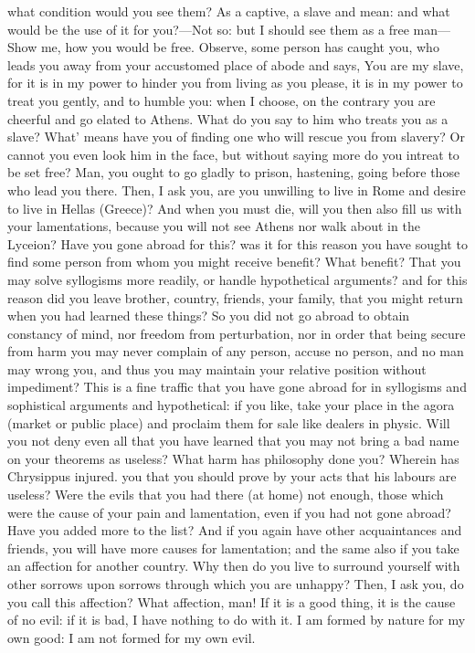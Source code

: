 \documentclass[12pt]{article}
\begin{document}
what condition would you see them? As a captive, a slave and mean: and what would be the use of it for you?—Not so: but I should see them as a free man—Show me, how you would be free. Observe, some person has caught you, who leads you away from your accustomed place of abode and says, You are my slave, for it is in my power to hinder you from living as you please, it is in my power to treat you gently, and to humble you: when I choose, on the contrary you are cheerful and go elated to Athens. What do you say to him who treats you as a slave? What' means have you of finding one who will rescue you from slavery? Or cannot you even look him in the face, but without saying more do you intreat to be set free? Man, you ought to go gladly to prison, hastening, going before those who lead you there. Then, I ask you, are you unwilling to live in Rome and desire to live in Hellas (Greece)? And when you must die, will you then also fill us with your lamentations, because you will not see Athens nor walk about in the Lyceion? Have you gone abroad for this? was it for this reason you have sought to find some person from whom you might receive benefit? What benefit? That you may solve syllogisms more readily, or handle hypothetical arguments? and for this reason did you leave brother, country, friends, your family, that you might return when you had learned these things? So you did not go abroad to obtain constancy of mind, nor freedom from perturbation, nor in order that being secure from harm you may never complain of any person, accuse no person, and no man may wrong you, and thus you may maintain your relative position without impediment? This is a fine traffic that you have gone abroad for in syllogisms and sophistical arguments and hypothetical: if you like, take your place in the agora (market or public place) and proclaim them for sale like dealers in physic. Will you not deny even all that you have learned that you may not bring a bad name on your theorems as useless? What harm has philosophy done you? Wherein has Chrysippus injured. you that you should prove by your acts that his labours are useless? Were the evils that you had there (at home) not enough, those which were the cause of your pain and lamentation, even if you had not gone abroad? Have you added more to the list? And if you again have other acquaintances and friends, you will have more causes for lamentation; and the same also if you take an affection for another country. Why then do you live to surround yourself with other sorrows upon sorrows through which you are unhappy? Then, I ask you, do you call this affection? What affection, man! If it is a good thing, it is the cause of no evil: if it is bad, I have nothing to do with it. I am formed by nature for my own good: I am not formed for my own evil.
\end{document}
